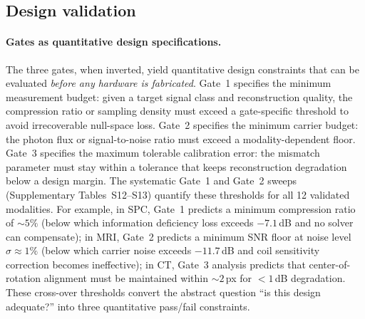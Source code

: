 \FloatBarrier
\subsection*{Design validation}

\paragraph{Gates as quantitative design specifications.}
The three gates, when inverted, yield quantitative design constraints that can be evaluated \emph{before any hardware is fabricated}. Gate~1 specifies the minimum measurement budget: given a target signal class and reconstruction quality, the compression ratio or sampling density must exceed a gate-specific threshold to avoid irrecoverable null-space loss. Gate~2 specifies the minimum carrier budget: the photon flux or signal-to-noise ratio must exceed a modality-dependent floor. Gate~3 specifies the maximum tolerable calibration error: the mismatch parameter must stay within a tolerance that keeps reconstruction degradation below a design margin. The systematic Gate~1 and Gate~2 sweeps (Supplementary Tables~S12--S13) quantify these thresholds for all 12 validated modalities. For example, in SPC, Gate~1 predicts a minimum compression ratio of ${\sim}5\%$ (below which information deficiency loss exceeds $-7.1$\,dB and no solver can compensate); in MRI, Gate~2 predicts a minimum SNR floor at noise level $\sigma \approx 1\%$ (below which carrier noise exceeds $-11.7$\,dB and coil sensitivity correction becomes ineffective); in CT, Gate~3 analysis predicts that center-of-rotation alignment must be maintained within ${\sim}2$\,px for $< 1$\,dB degradation. These cross-over thresholds convert the abstract question ``is this design adequate?'' into three quantitative pass/fail constraints.

